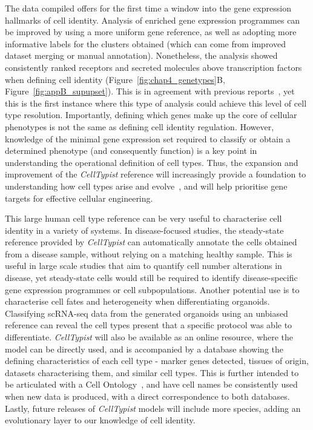 The data compiled offers for the first time a window into the gene expression hallmarks of cell identity. Analysis of enriched gene expression programmes can be improved by using a more uniform gene reference, as well as adopting more informative labels for the clusters obtained (which can come from improved dataset merging or manual annotation). Nonetheless, the analysis showed consistently ranked receptors and secreted molecules above transcription factors when defining cell identity (Figure~\ref{fig:chap4_genetypes}B, Figure~\ref{fig:appB_supupset}). This is in agreement with previous reports~\citep{sonawane_understanding_2017}, yet this is the first instance where this type of analysis could achieve this level of cell type resolution. Importantly, defining which genes make up the core of cellular phenotypes is not the same as defining cell identity regulation. However, knowledge of the minimal gene expression set required to classify or obtain a determined phenotype (and consequently function) is a key point in understanding the operational definition of cell types. Thus, the expansion and improvement of the \textit{CellTypist} reference will increasingly provide a foundation to understanding how cell types arise and evolve~\citep{zimmermann_ancient_2019}, and will help prioritise gene targets for effective cellular engineering.

This large human cell type reference can be very useful to characterise cell identity in a variety of systems. In disease-focused studies, the steady-state reference provided by \textit{CellTypist} can automatically annotate the cells obtained from a disease sample, without relying on a matching healthy sample. This is useful in large scale studies that aim to quantify cell number alterations in disease, yet steady-state cells would still be required to identify disease-specific gene expression programmes or cell subpopulations. Another potential use is to characterise cell fates and heterogeneity when differentiating organoids. Classifying scRNA-seq data from the generated organoids using an unbiased reference can reveal the cell types present that a specific protocol was able to differentiate. \textit{CellTypist} will also be available as an online resource, where the model can be directly used, and is accompanied by a database showing the defining characteristics of each cell type - marker genes detected, tissues of origin, datasets characterising them, and similar cell types. This is further intended to be articulated with a Cell Ontology~\citep{bard_ontology_2005}, and have cell names be consistently used when new data is produced, with a direct correspondence to both databases. Lastly, future releases of \textit{CellTypist} models will include more species, adding an evolutionary layer to our knowledge of cell identity.


